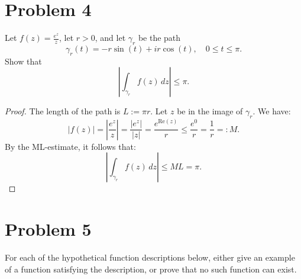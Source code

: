 \documentclass[a4paper,11pt]{article}
\begin{document}
\section*{Problem 4}
Let $f(z)=\frac{e^{z}}{z}$, let $r>0$, and let $\gamma_{r}$ be the path
\[ \gamma_{r}(t)=-r\sin(t)+ir\cos(t), \quad 0\le t\le\pi. \]
Show that
\[ \left|\int_{\gamma_{r}}f(z)\,dz\right|\le\pi. \]
\begin{proof}
    The length of the path is $L:=\pi r$. Let $z$ be in the image of $\gamma_r$. We have:
    \[ 
        |f(z)| = \left|\frac{e^z}{z}\right| = \frac{|e^z|}{|z|} = \frac{e^{\text{Re}(z)}}{r} \leq \frac{e^0}{r} = \frac{1}{r} =: M.
    \]
    By the ML-estimate, it follows that:
    \[ \left|\int_{\gamma_{r}}f(z)\,dz\right| \le M L = \pi. \]
\end{proof}

\section*{Problem 5}
For each of the hypothetical function descriptions below, either give an example of a function satisfying the description, or prove that no such function can exist.
\end{document}
